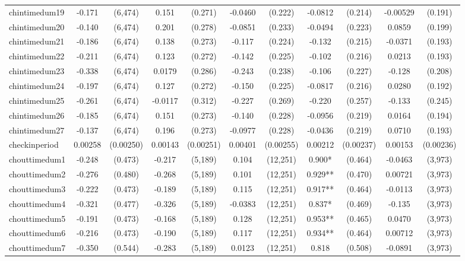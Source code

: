 \documentclass[]{article}
\begin{document}
\begin{tabular}{lcccccccccc}
chintimedum19 & -0.171 & (6,474) & 0.151 & (0.271) & -0.0460 & (0.222) & -0.0812 & (0.214) & -0.00529 & (0.191) \\
chintimedum20 & -0.140 & (6,474) & 0.201 & (0.278) & -0.0851 & (0.233) & -0.0494 & (0.223) & 0.0859 & (0.199) \\
chintimedum21 & -0.186 & (6,474) & 0.138 & (0.273) & -0.117 & (0.224) & -0.132 & (0.215) & -0.0371 & (0.193) \\
chintimedum22 & -0.211 & (6,474) & 0.123 & (0.272) & -0.142 & (0.225) & -0.102 & (0.216) & 0.0213 & (0.193) \\
chintimedum23 & -0.338 & (6,474) & 0.0179 & (0.286) & -0.243 & (0.238) & -0.106 & (0.227) & -0.128 & (0.208) \\
chintimedum24 & -0.197 & (6,474) & 0.127 & (0.272) & -0.150 & (0.225) & -0.0817 & (0.216) & 0.0280 & (0.192) \\
chintimedum25 & -0.261 & (6,474) & -0.0117 & (0.312) & -0.227 & (0.269) & -0.220 & (0.257) & -0.133 & (0.245) \\
chintimedum26 & -0.185 & (6,474) & 0.151 & (0.273) & -0.140 & (0.228) & -0.0956 & (0.219) & 0.0164 & (0.194) \\
chintimedum27 & -0.137 & (6,474) & 0.196 & (0.273) & -0.0977 & (0.228) & -0.0436 & (0.219) & 0.0710 & (0.193) \\
checkinperiod & 0.00258 & (0.00250) & 0.00143 & (0.00251) & 0.00401 & (0.00255) & 0.00212 & (0.00237) & 0.00153 & (0.00236) \\
chouttimedum1 & -0.248 & (0.473) & -0.217 & (5,189) & 0.104 & (12,251) & 0.900* & (0.464) & -0.0463 & (3,973) \\
chouttimedum2 & -0.276 & (0.480) & -0.268 & (5,189) & 0.101 & (12,251) & 0.929** & (0.470) & 0.00721 & (3,973) \\
chouttimedum3 & -0.222 & (0.473) & -0.189 & (5,189) & 0.115 & (12,251) & 0.917** & (0.464) & -0.0113 & (3,973) \\
chouttimedum4 & -0.321 & (0.477) & -0.326 & (5,189) & -0.0383 & (12,251) & 0.837* & (0.469) & -0.135 & (3,973) \\
chouttimedum5 & -0.191 & (0.473) & -0.168 & (5,189) & 0.128 & (12,251) & 0.953** & (0.465) & 0.0470 & (3,973) \\
chouttimedum6 & -0.216 & (0.473) & -0.190 & (5,189) & 0.117 & (12,251) & 0.934** & (0.464) & 0.00712 & (3,973) \\
chouttimedum7 & -0.350 & (0.544) & -0.283 & (5,189) & 0.0123 & (12,251) & 0.818 & (0.508) & -0.0891 & (3,973) \\

\end{tabular}
\end{document}
